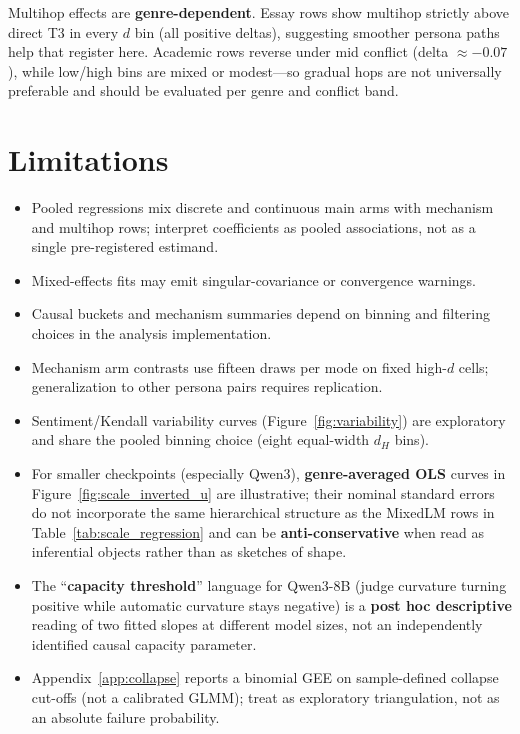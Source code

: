 \documentclass[sigconf,nonacm]{acmart}
\begin{document}
Multihop effects are \textbf{genre-dependent}. Essay rows show multihop strictly above direct T3 in every $d$ bin (all positive deltas), suggesting smoother persona paths help that register here. Academic rows reverse under mid conflict (delta ${\approx}{-}0.07$), while low/high bins are mixed or modest---so gradual hops are not universally preferable and should be evaluated per genre and conflict band.

\section{Limitations}

\begin{itemize}\itemsep2pt
\item Pooled regressions mix discrete and continuous main arms with mechanism and multihop rows; interpret coefficients as pooled associations, not as a single pre-registered estimand.
\item Mixed-effects fits may emit singular-covariance or convergence warnings.
\item Causal buckets and mechanism summaries depend on binning and filtering choices in the analysis implementation.
\item Mechanism arm contrasts use fifteen draws per mode on fixed high-$d$ cells; generalization to other persona pairs requires replication.
\item Sentiment/Kendall variability curves (Figure~\ref{fig:variability}) are exploratory and share the pooled binning choice (eight equal-width $d_H$ bins).
\item For smaller checkpoints (especially Qwen3), \textbf{genre-averaged OLS} curves in Figure~\ref{fig:scale_inverted_u} are illustrative; their nominal standard errors do not incorporate the same hierarchical structure as the MixedLM rows in Table~\ref{tab:scale_regression} and can be \textbf{anti-conservative} when read as inferential objects rather than as sketches of shape.
\item The ``\textbf{capacity threshold}'' language for Qwen3-8B (judge curvature turning positive while automatic curvature stays negative) is a \textbf{post hoc descriptive} reading of two fitted slopes at different model sizes, not an independently identified causal capacity parameter.
\item Appendix~\ref{app:collapse} reports a binomial GEE on sample-defined collapse cut-offs (not a calibrated GLMM); treat as exploratory triangulation, not as an absolute failure probability.
\end{itemize}
\end{document}
